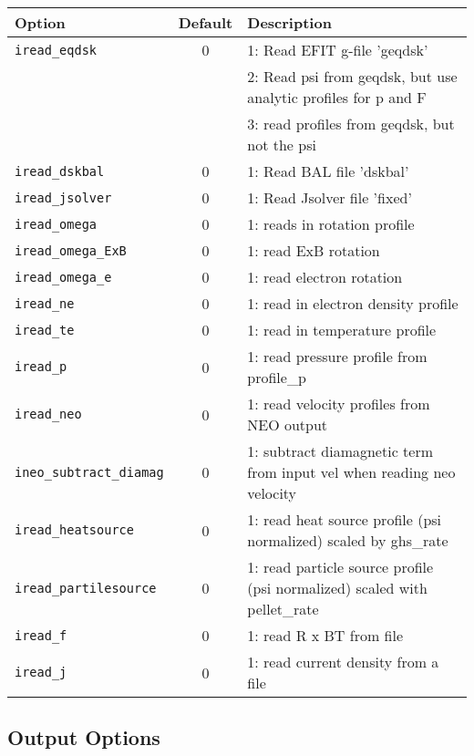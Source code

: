 \begin{tabular}{lcp{4in}}
  \textbf{Option}&\textbf{Default}&\textbf{Description}\\
  \hline
  \texttt{iread\_eqdsk}   & 0 & 1: Read EFIT g-file 'geqdsk'\\
                          &   & 2: Read psi from geqdsk, but use analytic profiles for p and F \\
                          &   & 3: read profiles from geqdsk, but not the psi \\
  \texttt{iread\_dskbal}  & 0 & 1: Read BAL file 'dskbal'\\
  \texttt{iread\_jsolver} & 0 & 1: Read Jsolver file 'fixed' \\

 \texttt{iread\_omega}       & 0 & 1: reads in rotation profile \\
 \texttt{iread\_omega\_ExB}  & 0 & 1: read ExB rotation \\
 \texttt{iread\_omega\_e}    & 0 & 1: read electron rotation \\
 \texttt{iread\_ne}          & 0 & 1: read in electron  density profile \\
 \texttt{iread\_te}          & 0 & 1: read in temperature profile \\
 \texttt{iread\_p}           & 0 & 1: read pressure profile from profile\_p \\
 \texttt{iread\_neo}         & 0 & 1: read velocity profiles from NEO output \\
 \texttt{ineo\_subtract\_diamag} & 0 & 1: subtract diamagnetic term from input vel when reading neo velocity \\
 \texttt{iread\_heatsource}      & 0 & 1: read heat source profile (psi normalized) scaled by ghs\_rate \\
 \texttt{iread\_partilesource}   & 0 & 1: read particle source profile (psi normalized) scaled with pellet\_rate \\
 \texttt{iread\_f}               & 0 & 1: read R x BT from file \\
 \texttt{iread\_j}               & 0 & 1: read current density from a file





\end{tabular}

\subsection{Output Options}

